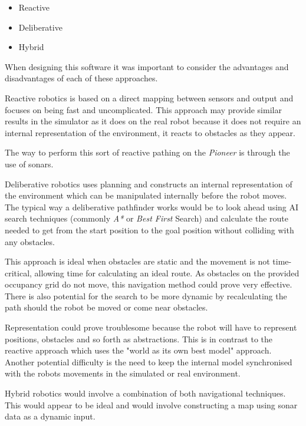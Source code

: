 \documentclass[a4paper,12pt]{article}
\begin{document}
\begin{itemize}
    \item{Reactive}
    \item{Deliberative}
    \item{Hybrid}
\end{itemize}
When designing this software it was important to consider the advantages and disadvantages of each of these approaches. 

Reactive robotics is based on a direct mapping between sensors and output and focuses on being fast and uncomplicated. This approach may provide similar results in the simulator as it does on the real robot because it does not require an internal representation of the environment, it reacts to obstacles as they appear.

The way to perform this sort of reactive pathing on the \textit{Pioneer} is through the use of sonars.

Deliberative robotics uses planning and constructs an internal representation of the environment which can be manipulated internally before the robot moves. The typical way a deliberative pathfinder works would be to look ahead using AI search techniques (commonly \textit{A*} or \textit{Best First} Search) and calculate the route needed to get from the start position to the goal position without colliding with any obstacles.

This approach is ideal when obstacles are static and the movement is not time-critical, allowing time for calculating an ideal route. As obstacles on the provided occupancy grid do not move, this navigation method could prove very effective. There is also potential for the search to be more dynamic by recalculating the path should the robot be moved or come near obstacles.

Representation could prove troublesome because the robot will have to represent positions, obstacles and so forth as abstractions. This is in contrast to the reactive approach which uses the "world as its own best model" approach. Another potential difficulty is the need to keep the internal model synchronised with the robots movements in the simulated or real environment.

Hybrid robotics would involve a combination of both navigational techniques. This would appear to be ideal and would involve constructing a map using sonar data as a dynamic input.
\end{document}
